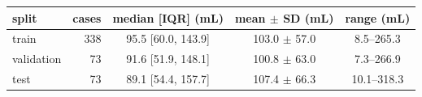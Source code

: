 \begin{tabular}{lrccc}
\toprule
split & cases & median [IQR] (mL) & mean $\pm$ SD (mL) & range (mL) \\
\midrule
train & 338 & 95.5 [60.0, 143.9] & 103.0 $\pm$ 57.0 & 8.5--265.3 \\
validation & 73 & 91.6 [51.9, 148.1] & 100.8 $\pm$ 63.0 & 7.3--266.9 \\
test & 73 & 89.1 [54.4, 157.7] & 107.4 $\pm$ 66.3 & 10.1--318.3 \\
\bottomrule
\end{tabular}